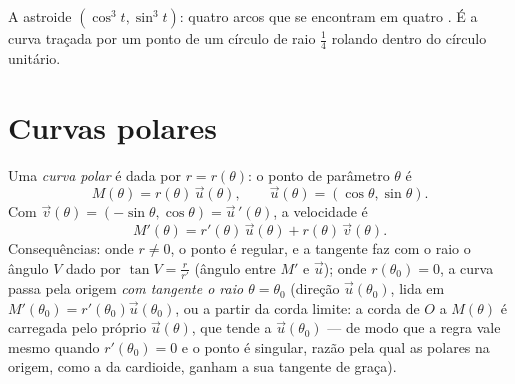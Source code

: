 \begin{omfigure}

{\small A astroide $(\cos^3 t, \sin^3 t)$: quatro arcos que se encontram em quatro
. É a curva traçada por um ponto de um círculo de raio
$\frac14$ rolando dentro do círculo unitário.}
\end{omfigure}

\section{Curvas polares}

\begin{definition}\label{def:b1:curves:polar}
Uma \emph{curva polar} é dada por $r = r(\theta)$: o ponto
de parâmetro $\theta$ é
\[
M(\theta) = r(\theta)\,\vec u(\theta),
\qquad \vec u(\theta) = (\cos\theta, \sin\theta).
\]
Com $\vec v(\theta) = (-\sin\theta, \cos\theta) = \vec
u\,'(\theta)$, a velocidade é
\[
M'(\theta) = r'(\theta)\, \vec u(\theta) + r(\theta)\, \vec
v(\theta) .
\]
Consequências: onde $r \neq 0$, o ponto é regular, e a tangente faz com o
raio o ângulo $V$ dado por $\tan V =
\frac{r}{r'}$ (ângulo entre $M'$ e $\vec u$); onde
$r(\theta_0)
= 0$, a curva passa pela origem \emph{com tangente o raio $\theta = \theta_0$}
(direção $\vec u(\theta_0)$, lida em $M'(\theta_0) = r'(\theta_0)\vec u(\theta_0)$, ou a partir da corda limite: a corda
de $O$ a $M(\theta)$ é carregada pelo próprio $\vec
u(\theta)$, que tende a $\vec u(\theta_0)$ ---
de modo que a regra vale mesmo quando $r'(\theta_0) = 0$ e o ponto é singular,
razão pela qual as  polares na origem, como a da cardioide,
ganham a sua tangente de graça).
\end{definition}

